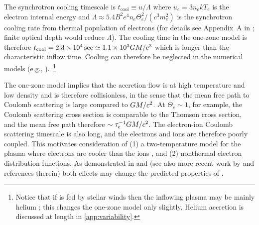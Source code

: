 The synchrotron cooling timescale is $t_\mathrm{cool} \equiv u/\Lambda$ where $u_e = 3 n_e k T_e$ is the electron internal energy and $\Lambda \approx 5.4 B^2 e^4 n_e \Theta_e^2 /(c^3 m_e^2)$ is the synchrotron cooling rate from thermal population of electrons (for details see Appendix~A in \citealt{2011ApJ...735....9M}; finite optical depth would reduce $\Lambda$). The cooling time in the one-zone model is therefore $t_\mathrm{cool}=2.3 \times 10^4\sec \simeq 1.1 \times 10^3 GM/c^3$ which is longer than the characteristic inflow time. Cooling can therefore be neglected in the numerical models (e.g., \citealt{2012MNRAS.426.1928D}).~\footnote{Notice that if \sgra is fed by stellar winds then the inflowing plasma may be mainly helium \citep{2019MNRAS.482L.123R}; this changes the one-zone model only slightly.  Helium accretion is discussed at length in \ref{app:variability}.}

The one-zone model implies that the accretion flow is at high temperature and low density and is therefore collisionless, in the sense that the mean free path to Coulomb scattering is large compared to $GM/c^2$. At $\Theta_e \sim 1$, for example, the Coulomb scattering cross section is comparable to the Thomson cross section, and the mean free path therefore $\sim \tau_e^{-1} GM/c^2$. The electron-ion Coulomb scattering timescale is also long, and the electrons and ions are therefore poorly coupled.  This motivates consideration of (1) a two-temperature model for the plasma where electrons are cooler than the ions \citep{1976ApJ...204..187S,1977ApJ...214..840I, 1982Natur.295...17R}, and (2) nonthermal electron distribution functions. As demonstrated in \citet{2000ApJ...541..234O} and \citet{2014A&A...570A...7M} (see also more recent work by \citealt{2018A&A...612A..34D} and references therein) both effects may change the predicted properties of \sgra.

